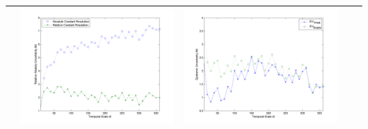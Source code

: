 \documentclass[11pt]{article}
\begin{document}
\begin{table}[H]
{\begin{tabular}{c  c   c   c  c }
&\begin{minipage}{.4\textwidth}\includegraphics[width=\linewidth]{resultgraph/02478500AU.png}\end{minipage}
&\begin{minipage}{.4\textwidth}\includegraphics[width=\linewidth]{resultgraph/02478500EU.png}\end{minipage}
\\

\bottomrule
\end{tabular}
}
\end{table}
\end{document}
